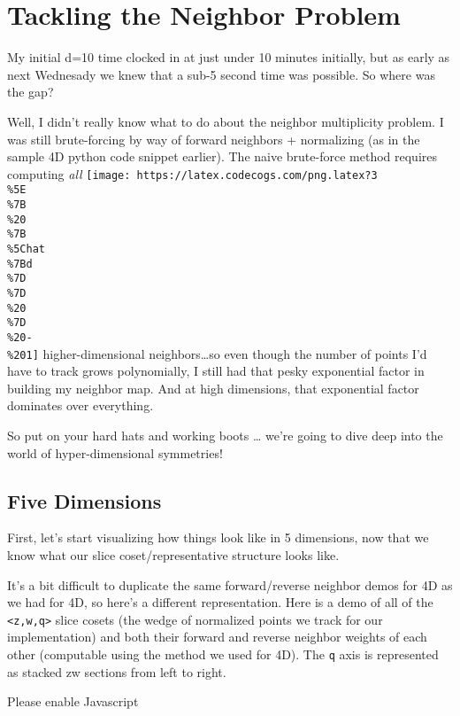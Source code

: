 \documentclass[]{article}
\begin{document}
\hypertarget{tackling-the-neighbor-problem}{%
\section{Tackling the Neighbor Problem}\label{tackling-the-neighbor-problem}}

My initial d=10 time clocked in at just under 10 minutes initially, but as early
as next Wednesady we knew that a sub-5 second time was possible. So where was
the gap?

Well, I didn't really know what to do about the neighbor multiplicity problem. I
was still brute-forcing by way of forward neighbors + normalizing (as in the
sample 4D python code snippet earlier). The naive brute-force method requires
computing \emph{all}
\texttt{[image: https://latex.codecogs.com/png.latex?3\\\%5E\\\%7B\\\%20\\\%7B\\\%5Chat\\\%7Bd\\\%7D\\\%7D\\\%20\\\%7D\\\%20-\\\%201]}
higher-dimensional neighbors\ldots so even though the number of points I'd have
to track grows polynomially, I still had that pesky exponential factor in
building my neighbor map. And at high dimensions, that exponential factor
dominates over everything.

So put on your hard hats and working boots \ldots{} we're going to dive deep
into the world of hyper-dimensional symmetries!

\hypertarget{five-dimensions}{%
\subsection{Five Dimensions}\label{five-dimensions}}

First, let's start visualizing how things look like in 5 dimensions, now that we
know what our slice coset/representative structure looks like.

It's a bit difficult to duplicate the same forward/reverse neighbor demos for 4D
as we had for 4D, so here's a different representation. Here is a demo of all of
the \texttt{\textless{}z,w,q\textgreater{}} slice cosets (the wedge of
normalized points we track for our implementation) and both their forward and
reverse neighbor weights of each other (computable using the method we used for
4D). The \texttt{q} axis is represented as stacked zw sections from left to
right.

\leavevmode\hypertarget{golSyms5D}{}%
Please enable Javascript
\end{document}
